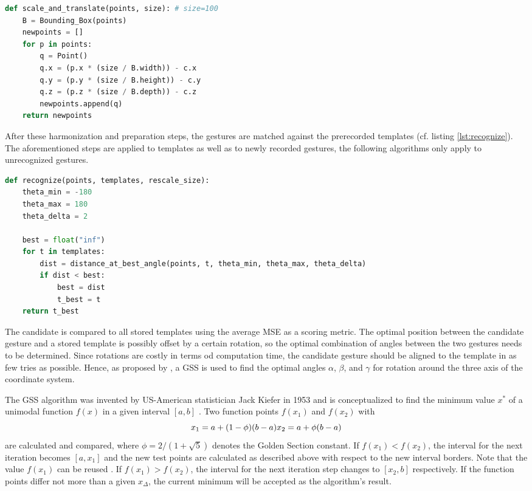 \begin{lstlisting}[label=lst:scale+translate,language=python,frame=lt,caption=Scaling to reference cube and translation to origin]
def scale_and_translate(points, size): # size=100
	B = Bounding_Box(points)
	newpoints = []
	for p in points:
		q = Point()
		q.x = (p.x * (size / B.width)) - c.x
		q.y = (p.y * (size / B.height)) - c.y
		q.z = (p.z * (size / B.depth)) - c.z
		newpoints.append(q)
	return newpoints
\end{lstlisting}

After these harmonization and preparation steps, the gestures are matched against the prerecorded templates (cf. listing \ref{lst:recognize}). The aforementioned steps are applied to templates as well as to newly recorded gestures, the following algorithms only apply to unrecognized gestures.

\begin{lstlisting}[label=lst:recognize,language=python,frame=lt,caption=Matching candidate gesture against every template]
def recognize(points, templates, rescale_size):
	theta_min = -180
	theta_max = 180
	theta_delta = 2

	best = float("inf")
	for t in templates:
		dist = distance_at_best_angle(points, t, theta_min, theta_max, theta_delta)
		if dist < best:
			best = dist
			t_best = t
	return t_best
\end{lstlisting}

The candidate is compared to all stored templates using the average \ac{MSE} as a scoring metric. The optimal position between the candidate gesture and a stored template is possibly offset by a certain rotation, so the optimal combination of angles between the two gestures needs to be determined. Since rotations are costly in terms od computation time, the candidate gesture should be aligned to the template in as few tries as possible. Hence, as proposed by \cite{Kratz2010}, a \ac{GSS} is used to find the optimal angles $\alpha$, $\beta$, and $\gamma$ for rotation around the three axis of the coordinate system.

The \ac{GSS} algorithm was invented by US-American statistician Jack Kiefer in 1953  and is conceptualized to find the minimum value $x^*$ of a unimodal function $f(x)$ in a given interval $[a,b]$ \cite{Kiefer1953}. Two function points $f(x_1)$ and $f(x_2)$ with 
\[ x_1=a+(1-\phi)(b-a) \\
x_2=a+\phi(b-a) \]
are calculated and compared, where $\phi=2/(1+\sqrt{5})$ denotes the Golden Section constant. If $f(x_1) < f(x_2)$, the interval for the next iteration becomes $[a,x_1]$ and the new test points are calculated as described above with respect to the new interval borders. Note that the value $f(x_1)$ can be reused \cite{chang2009n}. If $f(x_1) > f(x_2)$, the interval for the next iteration step changes to $[x_2, b]$ respectively. If the function points differ not more than a given $x_\Delta$, the current minimum will be accepted as the algorithm's result.

